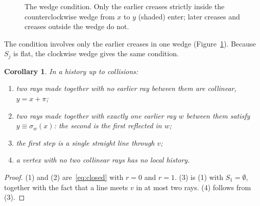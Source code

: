 \documentclass[11pt]{article}
\newtheorem{corollary}[theorem]{Corollary}
\theoremstyle{definition}
\theoremstyle{remark}
\begin{document}
\begin{figure}[t]
\centering
{}
\caption{The wedge condition. Only the earlier creases strictly inside the counterclockwise wedge from $x$ to $y$ (shaded) enter; later creases and creases outside the wedge do not.}
\label{fig:wedge}
\end{figure}

The condition involves only the earlier creases in one wedge (Figure~\ref{fig:wedge}). Because $S_j$ is flat, the clockwise wedge gives the same condition.

\begin{corollary}\label{cor:wedge}
In a history up to collisions:
\begin{enumerate}
\item two rays made together with no earlier ray between them are collinear, $y=x+\pi$;
\item two rays made together with exactly one earlier ray $w$ between them satisfy $y\equiv\sigma_w(x)$: the second is the first reflected in $w$;
\item the first step is a single straight line through $v$;
\item a vertex with no two collinear rays has no local history.
\end{enumerate}
\end{corollary}

\begin{proof}
(1) and (2) are~\eqref{eq:closed} with $r=0$ and $r=1$. (3) is (1) with $S_1=\emptyset$, together with the fact that a line meets $v$ in at most two rays. (4) follows from (3).
\end{proof}
\end{document}
